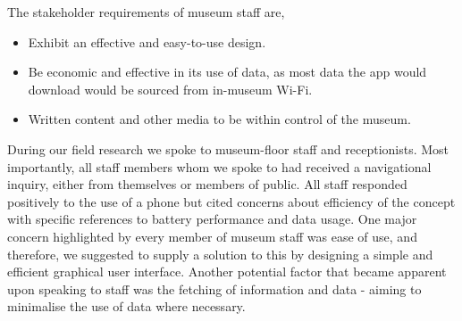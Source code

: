 The stakeholder requirements of museum staff are,

\begin{itemize}
    \item Exhibit an effective and easy-to-use design. 
    \item Be economic and effective in its use of data, as most data the app would download would be sourced from in-museum Wi-Fi. 
    \item Written content and other media to be within control of the museum.
\end{itemize}

During our field research we spoke to museum-floor staff and receptionists. Most importantly, all staff members whom we spoke to had received a navigational inquiry, either from themselves or members of public. All staff responded positively to the use of a phone but cited concerns about efficiency of the concept with specific references to battery performance and data usage. One major concern highlighted by every member of museum staff was ease of use, and therefore, we suggested to supply a solution to this by designing a simple and efficient graphical user interface. Another potential factor that became apparent upon speaking to staff was the fetching of information and data - aiming to minimalise the use of data where necessary.